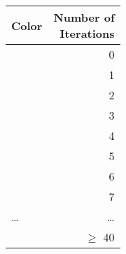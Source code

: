 \documentclass{standalone}
\begin{document}
\renewcommand{\arraystretch}{1.2}
    \begin{tabular}{lr}
        \hline
        Color & \makecell{Number of\\ Iterations} \\ 
        \hline
        \cellcolor{color1} & 0 \\
        \cellcolor{color2} & 1 \\
        \cellcolor{color3} & 2 \\
        \cellcolor{color4} & 3 \\
        \cellcolor{color5} & 4 \\
        \cellcolor{color6} & 5 \\
        \cellcolor{color7} & 6 \\
        \cellcolor{color8} & 7 \\
        \ldots & \ldots \\ 
        \cellcolor{black} & $\geq$ 40 \\
        \hline
    \end{tabular}
\end{document}
